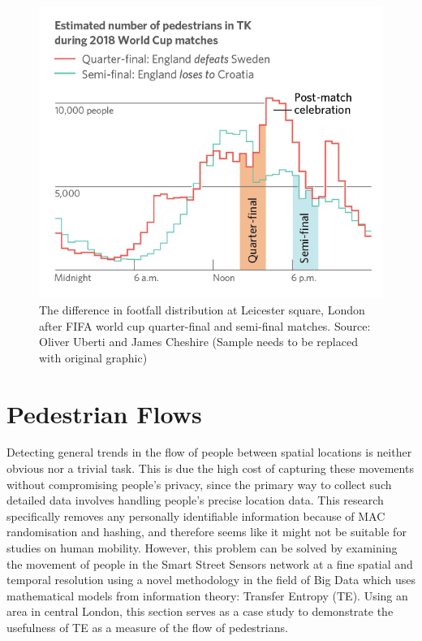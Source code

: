 \begin{figure}
  \forceversofloat
  \includegraphics[trim={0 0 0 0},clip]{images/applications-football-sample.png}
  \caption{The difference in footfall distribution at Leicester square, London after FIFA world cup quarter-final and semi-final matches. Source: Oliver Uberti and James Cheshire (Sample needs to be replaced with original graphic)}
  \label{figure:applications:football}
\end{figure}

\section{Pedestrian Flows}

Detecting general trends in the flow of people between spatial locations is neither obvious nor a trivial task. This is due the high cost of capturing these movements without compromising people’s privacy, since the primary way to collect such detailed data involves handling people’s precise location data. This research specifically removes any personally identifiable information because of MAC randomisation and hashing, and therefore seems like it might not be suitable for studies on human mobility. However, this problem can be solved by examining the movement of people in the Smart Street Sensors network at a fine spatial and temporal resolution using a novel methodology in the field of Big Data which uses mathematical models from information theory: Transfer Entropy (TE). Using an area in central London, this section serves as a case study to demonstrate the usefulness of TE as a measure of the flow of pedestrians.

